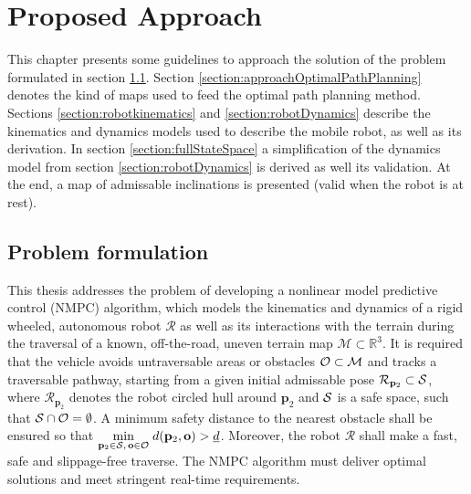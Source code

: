

\chapter{Proposed Approach}
\label{chapter:proposedApproach}

This chapter presents some guidelines to approach the solution of the problem formulated in section \ref{section:problemFormulation}. Section \ref{section:approachOptimalPathPlanning} denotes the kind of maps used to feed the optimal path planning method. Sections \ref{section:robotkinematics} and \ref{section:robotDynamics} describe the kinematics and dynamics models used to describe the mobile robot, as well as its derivation. In section \ref{section:fullStateSpace} a simplification of the dynamics model from section \ref{section:robotDynamics} is derived as well its validation. At the end, a map of admissable inclinations is presented (valid when the robot is at rest).

\section{Problem formulation}
\label{section:problemFormulation}

This thesis addresses the problem of developing a nonlinear model predictive control (NMPC) \cite{Rawlings2013, grunenmpc} algorithm, which models the kinematics and dynamics of a rigid wheeled, autonomous robot $\mathcal{R}$ as well as its interactions with the terrain during the traversal of a known, off-the-road, uneven terrain map $\mathcal{M} \subset \mathbb{R}^3$. It is required that the vehicle avoids untraversable areas or obstacles $\mathcal{\mathcal{O}} \subset \mathcal{\mathcal{M}}$ and tracks a traversable pathway, starting from a given initial admissable pose $\mathcal{R}_{\mathbf{p}_2} \subset \mathcal{S}$, where $\mathcal{R}_{\mathbf{p}_2}$ denotes the robot circled hull around $\mathbf{p}_2$ and $\mathcal{S}$ is a safe space, such that $\mathcal{S} \cap \mathcal{O} = \emptyset$. A minimum safety distance to the nearest obstacle shall be ensured so that $\underset{\mathbf{p}_2 \in \mathcal{S},\, \mathbf{o} \in \mathcal{O}}{\text{min}}\; d(\mathbf{p}_2, \mathbf{o}) > \underline{d}$. Moreover, the robot $\mathcal{R}$ shall make a fast, safe and slippage-free traverse.  The NMPC algorithm must deliver optimal solutions and meet stringent real-time requirements.

